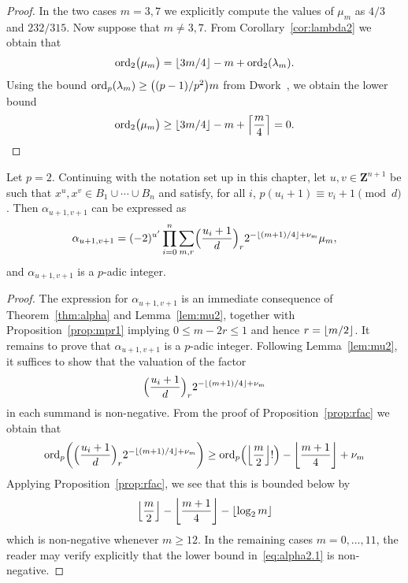 \begin{proof}
In the two cases $m = 3, 7$ we explicitly compute the values of 
$\mu_m$ as $4/3$ and $232/315$.  Now suppose that $m \neq 3, 7$. 
From Corollary~\ref{cor:lambda2} we obtain that 
\begin{equation*}
\operatorname{ord}_2 \bigl(\mu_m\bigr) 
    = \left\lfloor3m/4\right\rfloor - m + \operatorname{ord}_2(\lambda_m).
\end{equation*}
Using the bound $\operatorname{ord}_p(\lambda_m) \geq \bigl((p-1)/p^2\bigr) m$ from 
Dwork~\citep[Pages~55--57]{Dwork62}, we obtain the lower bound 
\begin{equation*}
\operatorname{ord}_2 \bigl(\mu_m\bigr) 
    \geq \left\lfloor3m/4\right\rfloor - m + \left\lceil\frac{m}{4}\right\rceil = 0. \qedhere
\end{equation*}
\end{proof}

\begin{thm} \label{thm:alpha2}
Let $p = 2$. 
Continuing with the notation set up in this chapter, let 
$u, v \in \mathbf{Z}^{n+1}$ be such that 
$x^u, x^v \in B_1 \cup \dotsb \cup B_n$ and satisfy, 
for all $i$, $p (u_i + 1) \equiv v_i + 1 \pmod{d}$. 
Then $\alpha_{u+1,v+1}$ can be expressed as 
\begin{equation} \label{eq:alpha2.0}
\alpha_{u+1,v+1} = (-2)^{u'} \prod_{i=0}^n \sum_{m,r} 
    \Bigl(\frac{u_i+1}{d}\Bigr)_r 2^{-\left\lfloor(m+1)/4\right\rfloor+\nu_m} \mu_m, 
\end{equation}
and $\alpha_{u+1,v+1}$ is a $p$-adic integer.
\end{thm}

\begin{proof}
The expression for $\alpha_{u+1,v+1}$ is an immediate consequence 
of Theorem~\ref{thm:alpha} and Lemma~\ref{lem:mu2}, together with 
Proposition~\ref{prop:mpr1} implying $0 \leq m - 2r \leq 1$ and 
hence $r = \left\lfloor m/2\right\rfloor$.  It remains to prove that 
$\alpha_{u+1,v+1}$ is a $p$-adic integer.  Following Lemma~\ref{lem:mu2}, 
it suffices to show that the valuation of the factor 
\begin{equation*}
\Bigl(\frac{u_i+1}{d}\Bigr)_r 2^{- \left\lfloor(m+1)/4\right\rfloor + \nu_m}
\end{equation*}
in each summand is non-negative.  From the proof of 
Proposition~\ref{prop:rfac} we obtain that 
\begin{equation} \label{eq:alpha2.1}
\operatorname{ord}_p \biggl( \Bigl(\frac{u_i+1}{d}\Bigr)_r 2^{- \left\lfloor(m+1)/4\right\rfloor + \nu_m} \biggr)
\geq \operatorname{ord}_p\Bigl(\left\lfloor\frac{m}{2}\right\rfloor!\Bigr) - \left\lfloor\frac{m+1}{4}\right\rfloor + \nu_m
\end{equation}
Applying Proposition~\ref{prop:rfac}, we see that this is bounded 
below by 
\begin{equation*}
\left\lfloor\frac{m}{2}\right\rfloor - \left\lfloor\frac{m+1}{4}\right\rfloor - \left\lfloor\log_2 m\right\rfloor
\end{equation*}
which is non-negative whenever $m \geq 12$.  In the remaining 
cases $m = 0, \dotsc, 11$, the reader may verify explicitly 
that the lower bound in~\eqref{eq:alpha2.1} is non-negative.
\end{proof}

